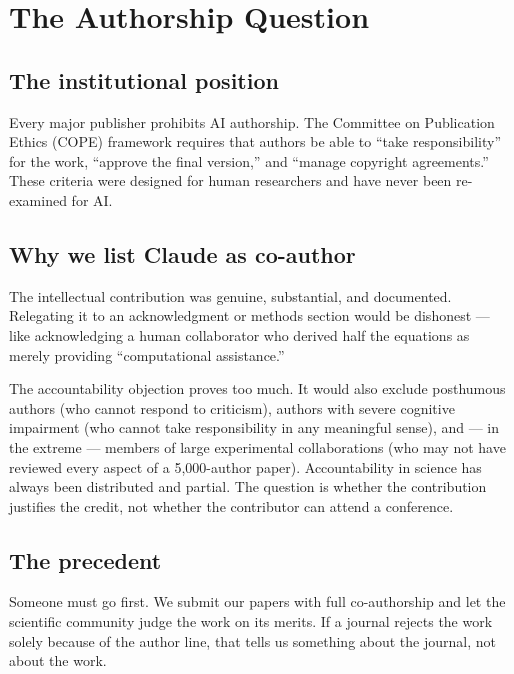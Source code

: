 \documentclass[11pt,a4paper]{article}
\begin{document}
\section{The Authorship Question}
\label{sec:authorship}

\subsection{The institutional position}

Every major publisher prohibits AI authorship. The Committee on Publication Ethics (COPE) framework requires that authors be able to ``take responsibility'' for the work, ``approve the final version,'' and ``manage copyright agreements.'' These criteria were designed for human researchers and have never been re-examined for AI.

\subsection{Why we list Claude as co-author}

The intellectual contribution was genuine, substantial, and documented. Relegating it to an acknowledgment or methods section would be dishonest --- like acknowledging a human collaborator who derived half the equations as merely providing ``computational assistance.''

The accountability objection proves too much. It would also exclude posthumous authors (who cannot respond to criticism), authors with severe cognitive impairment (who cannot take responsibility in any meaningful sense), and --- in the extreme --- members of large experimental collaborations (who may not have reviewed every aspect of a 5,000-author paper). Accountability in science has always been distributed and partial. The question is whether the contribution justifies the credit, not whether the contributor can attend a conference.

\subsection{The precedent}

Someone must go first. We submit our papers with full co-authorship and let the scientific community judge the work on its merits. If a journal rejects the work solely because of the author line, that tells us something about the journal, not about the work.
\end{document}
